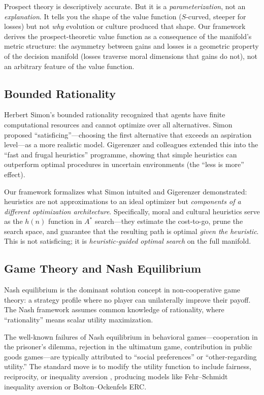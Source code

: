 \documentclass[12pt]{article}
\theoremstyle{definition}
\theoremstyle{remark}
\begin{document}
Prospect theory is descriptively accurate.  But it is a \emph{parameterization}, not an \emph{explanation}.  It tells you the shape of the value function ($S$-curved, steeper for losses) but not \emph{why} evolution or culture produced that shape.  Our framework derives the prospect-theoretic value function as a consequence of the manifold's metric structure: the asymmetry between gains and losses is a geometric property of the decision manifold (losses traverse moral dimensions that gains do not), not an arbitrary feature of the value function.

\subsection{Bounded Rationality}

Herbert Simon's bounded rationality \cite{simon1955} recognized that agents have finite computational resources and cannot optimize over all alternatives.  Simon proposed ``satisficing''---choosing the first alternative that exceeds an aspiration level---as a more realistic model.  Gigerenzer and colleagues \cite{gigerenzer1999} extended this into the ``fast and frugal heuristics'' programme, showing that simple heuristics can outperform optimal procedures in uncertain environments (the ``less is more'' effect).

Our framework formalizes what Simon intuited and Gigerenzer demonstrated: heuristics are not approximations to an ideal optimizer but \emph{components of a different optimization architecture}.  Specifically, moral and cultural heuristics serve as the $h(n)$ function in $A^*$ search---they estimate the cost-to-go, prune the search space, and guarantee that the resulting path is optimal \emph{given the heuristic}.  This is not satisficing; it is \emph{heuristic-guided optimal search} on the full manifold.

\subsection{Game Theory and Nash Equilibrium}

Nash equilibrium \cite{nash1950} is the dominant solution concept in non-cooperative game theory: a strategy profile where no player can unilaterally improve their payoff.  The Nash framework assumes common knowledge of rationality, where ``rationality'' means scalar utility maximization.

The well-known failures of Nash equilibrium in behavioral games---cooperation in the prisoner's dilemma, rejection in the ultimatum game, contribution in public goods games---are typically attributed to ``social preferences'' or ``other-regarding utility.''  The standard move is to modify the utility function to include fairness, reciprocity, or inequality aversion \cite{fehr1999,bolton2000}, producing models like Fehr--Schmidt inequality aversion or Bolton--Ockenfels ERC.
\end{document}
